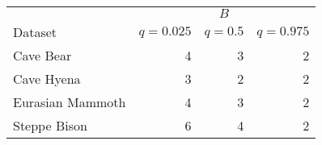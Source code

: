 
\begin{tabular}{lrrr}
\toprule
& \multicolumn{3}{c}{$B$} \\
Dataset & $q = 0.025$ & $q = 0.5$ & $q = 0.975$\\
\midrule
Cave Bear & 4 & 3 & 2\\
Cave Hyena & 3 & 2 & 2\\
Eurasian Mammoth & 4 & 3 & 2\\
Steppe Bison & 6 & 4 & 2\\
\bottomrule
\end{tabular}
